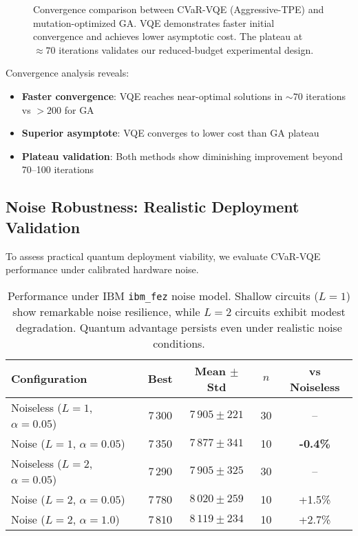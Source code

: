 \begin{figure}[htb]
    \centering
    \caption{Convergence comparison between CVaR-VQE (Aggressive-TPE) and mutation-optimized GA. VQE demonstrates faster initial convergence and achieves lower asymptotic cost. The plateau at $\approx 70$ iterations validates our reduced-budget experimental design.}
    \label{fig:learning_curves}
\end{figure}

Convergence analysis reveals:
\begin{itemize}[nosep]
    \item \textbf{Faster convergence}: VQE reaches near-optimal solutions in $\sim 70$ iterations vs $>200$ for GA
    \item \textbf{Superior asymptote}: VQE converges to lower cost than GA plateau
    \item \textbf{Plateau validation}: Both methods show diminishing improvement beyond 70--100 iterations
\end{itemize}

\subsection{Noise Robustness: Realistic Deployment Validation}

To assess practical quantum deployment viability, we evaluate CVaR-VQE performance under calibrated hardware noise.


\begin{table}[htb]
    \centering
    \caption{Performance under IBM \texttt{ibm\_fez} noise model. Shallow circuits ($L=1$) show remarkable noise resilience, while $L=2$ circuits exhibit modest degradation. Quantum advantage persists even under realistic noise conditions.}
    \label{tab:noise_robustness}
    \begin{tabular}{lcccc}
        \toprule
        Configuration & Best & Mean $\pm$ Std & $n$ & vs Noiseless \\
        \midrule
        Noiseless ($L=1$, $α=0.05$) & 7\,300 & $7\,905 \pm 221$ & 30 & -- \\
        Noise ($L=1$, $α=0.05$) & 7\,350 & $7\,877 \pm 341$ & 10 & \textbf{-0.4\%} \\
        \midrule
        Noiseless ($L=2$, $α=0.05$) & 7\,290 & $7\,905 \pm 325$ & 30 & -- \\
        Noise ($L=2$, $α=0.05$) & 7\,780 & $8\,020 \pm 259$ & 10 & +1.5\% \\
        Noise ($L=2$, $α=1.0$) & 7\,810 & $8\,119 \pm 234$ & 10 & +2.7\% \\
        \bottomrule
    \end{tabular}
\end{table}

